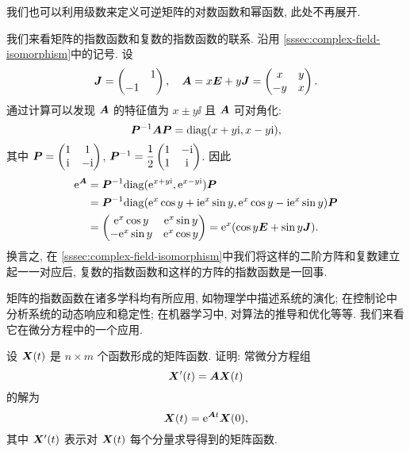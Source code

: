 我们也可以利用级数来定义可逆矩阵的对数函数和幂函数, 此处不再展开.

我们来看矩阵的指数函数和复数的指数函数的联系.
沿用 \ref{sssec:complex-field-isomorphism}中的记号.
设
\[
  {\boldsymbol{J}}=\begin{pmatrix}
    &1\\-1&
  \end{pmatrix},\quad
  {\boldsymbol{A}}=x{\boldsymbol{E}}+y{\boldsymbol{J}}=\begin{pmatrix}
    x&y\\-y&x
  \end{pmatrix}.
\]
通过计算可以发现 ${\boldsymbol{A}}$ 的特征值为 $x\pm y\ii$ 且 ${\boldsymbol{A}}$ 可对角化:
\[
  {\boldsymbol{P}}^{-1}{\boldsymbol{A}}{\boldsymbol{P}}={\mathrm{diag}}(x+y\mathrm{i},x-y\mathrm{i}), 
\]
其中 ${\boldsymbol{P}}=\begin{pmatrix}
  1&1\\\mathrm{i}&-\mathrm{i}
\end{pmatrix}$, ${\boldsymbol{P}}^{-1}=\dfrac12\begin{pmatrix}
  1&-\mathrm{i}\\1&\mathrm{i}
\end{pmatrix}$.
因此
\begin{align*}
  \mathrm{e}^{\boldsymbol{A}}&
  ={\boldsymbol{P}}^{-1}{\mathrm{diag}}(\mathrm{e}^{x+y\mathrm{i}},\mathrm{e}^{x-y\mathrm{i}}){\boldsymbol{P}}\\&
  ={\boldsymbol{P}}^{-1}{\mathrm{diag}}(\mathrm{e}^x\cos y+\mathrm{i}\mathrm{e}^x\sin y,
    \mathrm{e}^x\cos y-\mathrm{i}\mathrm{e}^x\sin y){\boldsymbol{P}}\\&
  =\begin{pmatrix}
    \mathrm{e}^x\cos y&\mathrm{e}^x\sin y\\
    -\mathrm{e}^x\sin y&\mathrm{e}^x\cos y
  \end{pmatrix}
  =\mathrm{e}^x(\cos y{\boldsymbol{E}}+\sin y {\boldsymbol{J}}).
\end{align*}
换言之, 在 \ref{sssec:complex-field-isomorphism}中我们将这样的二阶方阵和复数建立起一一对应后, 复数的指数函数和这样的方阵的指数函数是一回事.

矩阵的指数函数在诸多学科均有所应用, 如物理学中描述系统的演化; 在控制论中分析系统的动态响应和稳定性; 在机器学习中, 对算法的推导和优化等等.
我们来看它在微分方程中的一个应用.

\begin{example}
  \label{exam:matrix-exponential-derivative}
  设 ${\boldsymbol{X}}(t)$ 是 $n\times m$ 个函数形成的矩阵函数.
  证明: 常微分方程组
  \[
    {\boldsymbol{X}}'(t)={\boldsymbol{A}}{\boldsymbol{X}}(t)
  \]
  的解为 
  \[
    {\boldsymbol{X}}(t)=\mathrm{e}^{{\boldsymbol{A}} t}{\boldsymbol{X}}(0),
  \]
  其中 ${\boldsymbol{X}}'(t)$ 表示对 ${\boldsymbol{X}}(t)$ 每个分量求导得到的矩阵函数.
\end{example}

